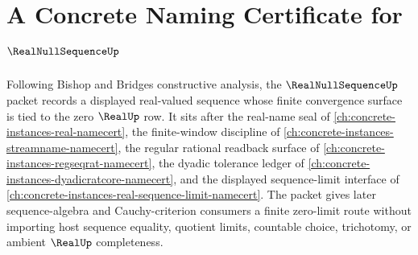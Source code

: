 \chapter{A Concrete Naming Certificate for $\RealNullSequenceUp$}
\label{ch:concrete-instances-real-null-sequence-namecert}

Following Bishop and Bridges constructive analysis, the $\RealNullSequenceUp$ packet records a displayed real-valued sequence whose finite convergence surface is tied to the zero $\RealUp$ row. It sits after the real-name seal of \autoref{ch:concrete-instances-real-namecert}, the finite-window discipline of \autoref{ch:concrete-instances-streamname-namecert}, the regular rational readback surface of \autoref{ch:concrete-instances-regseqrat-namecert}, the dyadic tolerance ledger of \autoref{ch:concrete-instances-dyadicratcore-namecert}, and the displayed sequence-limit interface of \autoref{ch:concrete-instances-real-sequence-limit-namecert}. The packet gives later sequence-algebra and Cauchy-criterion consumers a finite zero-limit route without importing host sequence equality, quotient limits, countable choice, trichotomy, or ambient $\RealUp$ completeness.


